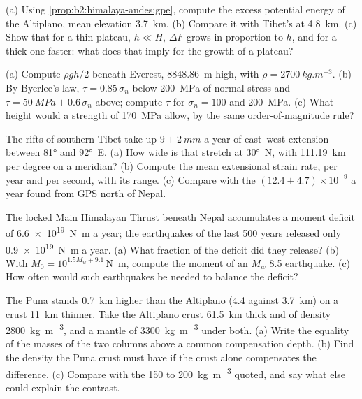 \begin{exercise}[$\star\star$]\label{exo:b2:himalaya-andes:6}
(a) Using \cref{prop:b2:himalaya-andes:gpe}, compute the excess potential energy of the
Altiplano, mean elevation \qty{3.7}{km}. (b) Compare it with Tibet's at \qty{4.8}{km}.
(c) Show that for a thin plateau, $h \ll H$, $\Delta F$ grows in proportion to $h$, and for a
thick one faster: what does that imply for the growth of a plateau?
\end{exercise}

\begin{exercise}[$\star\star$]\label{exo:b2:himalaya-andes:7}
(a) Compute $\rho g h/2$ beneath Everest, \qty{8848.86}{m} high, with $\rho =
\qty{2700}{kg.m^{-3}}$. (b) By Byerlee's law, $\tau = 0.85\,\sigma_n$ below \qty{200}{MPa} of
normal stress and $\tau = \qty{50}{MPa} + 0.6\,\sigma_n$ above; compute $\tau$ for $\sigma_n =
100$ and \qty{200}{MPa}. (c) What height would a strength of \qty{170}{MPa} allow, by the same
order-of-magnitude rule?
\end{exercise}

\begin{exercise}[$\star\star$]\label{exo:b2:himalaya-andes:8}
The rifts of southern Tibet take up $9 \pm \qty{2}{mm}$ a year of east--west extension between
\ang{81} and \ang{92}~E. (a) How wide is that stretch at \ang{30}~N, with \qty{111.19}{km} per
degree on a meridian? (b) Compute the mean extensional strain rate, per year and per second,
with its range. (c) Compare with the $(12.4 \pm 4.7) \times 10^{-9}$ a year found from GPS north of Nepal.
\end{exercise}

\begin{exercise}[$\star\star$]\label{exo:b2:himalaya-andes:9}
The locked Main Himalayan Thrust beneath Nepal accumulates a moment deficit of
\qty{6.6e19}{N.m} a year; the earthquakes of the last 500 years released only
\qty{0.9e19}{N.m} a year. (a) What fraction of the deficit did they release? (b) With $M_0 =
10^{1.5 M_w + 9.1}$\,\unit{N.m}, compute the moment of an $M_w$ 8.5 earthquake. (c) How often
would such earthquakes be needed to balance the deficit?
\end{exercise}

\begin{exercise}[$\star\star\star$]\label{exo:b2:himalaya-andes:10}
The Puna stands \qty{0.7}{km} higher than the Altiplano (4.4 against \qty{3.7}{km}) on a crust
\qty{11}{km} thinner. Take the Altiplano crust \qty{61.5}{km} thick and of density
\qty{2800}{kg.m^{-3}}, and a mantle of \qty{3300}{kg.m^{-3}} under both. (a) Write the
equality of the masses of the two columns above a common compensation depth. (b) Find the
density the Puna crust must have if the crust alone compensates the difference. (c) Compare
with the 150 to \qty{200}{kg.m^{-3}} quoted, and say what else could explain the contrast.
\end{exercise}

